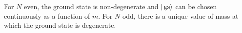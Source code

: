 \begin{conj}
For $N$ even, the ground state is non-degenerate and $|\operatorname{gs}\rangle$ can be chosen continuously as a function of $m$. For $N$ odd, there is a unique value of mass at which the ground state is degenerate.
\end{conj}


